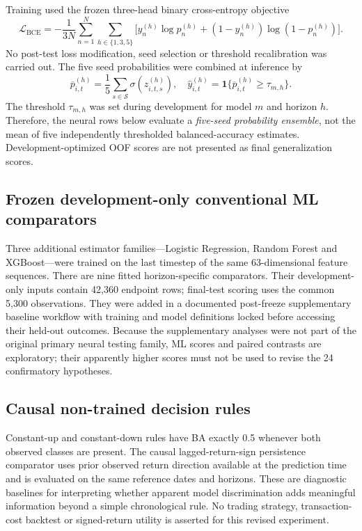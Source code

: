 \documentclass[fleqn,10pt]{wlscirep}
\begin{document}
Training used the frozen three-head binary cross-entropy objective
\begin{equation}\label{eq:loss}
\mathcal{L}_{\mathrm{BCE}}=-\frac{1}{3N}\sum_{n=1}^{N}\sum_{h\in\{1,3,5\}}\Big[y_{n}^{(h)}\log p_{n}^{(h)}+(1-y_{n}^{(h)})\log(1-p_{n}^{(h)})\Big].
\end{equation}
No post-test loss modification, seed selection or threshold recalibration was carried out. The five seed probabilities were combined at inference by
\begin{equation}\label{eq:ensemble}
\overline p^{(h)}_{i,t}=\frac15\sum_{s\in\mathcal S}\sigma(z^{(h)}_{i,t,s}),\quad
\widehat y^{(h)}_{i,t}=\mathbf1\{\overline p^{(h)}_{i,t}\ge\tau_{m,h}\}.
\end{equation}
The threshold $\tau_{m,h}$ was set during development for model $m$ and horizon $h$. Therefore, the neural rows below evaluate a \emph{five-seed probability ensemble}, not the mean of five independently thresholded balanced-accuracy estimates. Development-optimized OOF scores are not presented as final generalization scores.

\subsection{Frozen development-only conventional ML comparators}
Three additional estimator families---Logistic Regression, Random Forest and XGBoost---were trained on the last timestep of the same 63-dimensional feature sequences. There are nine fitted horizon-specific comparators. Their development-only inputs contain 42,360 endpoint rows; final-test scoring uses the common 5,300 observations. They were added in a documented post-freeze supplementary baseline workflow with training and model definitions locked before accessing their held-out outcomes. Because the supplementary analyses were not part of the original primary neural testing family, ML scores and paired contrasts are exploratory; their apparently higher scores must not be used to revise the 24 confirmatory hypotheses.

\subsection{Causal non-trained decision rules}
Constant-up and constant-down rules have BA exactly 0.5 whenever both observed classes are present. The causal lagged-return-sign persistence comparator uses prior observed return direction available at the prediction time and is evaluated on the same reference dates and horizons. These are diagnostic baselines for interpreting whether apparent model discrimination adds meaningful information beyond a simple chronological rule. No trading strategy, transaction-cost backtest or signed-return utility is asserted for this revised experiment.
\end{document}
